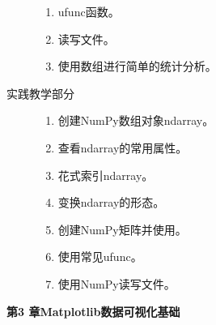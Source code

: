 \documentclass[12pt,a4paper,openany,cap]{ctexbook}
\begin{document}
\begin{description}
\begin{minipage}[t]{0.8\linewidth}
\begin{enumerate}
\item\label{item:73}  ufunc函数。
\item\label{item:74}  读写文件。
\item\label{item:75}  使用数组进行简单的统计分析。
      \end{enumerate}
    \end{minipage}
\item[实践教学部分]
  \begin{minipage}[t]{0.8\linewidth}
    \begin{enumerate}
    \item  创建NumPy数组对象ndarray。
\item\label{item:76}  查看ndarray的常用属性。
\item\label{item:77}  花式索引ndarray。
\item\label{item:78}  变换ndarray的形态。
\item\label{item:79}  创建NumPy矩阵并使用。
\item\label{item:80}  使用常见ufunc。
\item\label{item:81}  使用NumPy读写文件。
    \end{enumerate}
  \end{minipage}
  
\end{description}

\begin{center}
   \textbf{第3 章\quad Matplotlib数据可视化基础}
\end{center}
\end{document}
